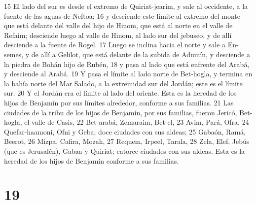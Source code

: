 15 El lado del sur es desde el extremo de Quiriat-jearim, y sale al occidente, a la fuente de las aguas de Neftoa;
16 y desciende este límite al extremo del monte que está delante del valle del hijo de Hinom, que está al norte en el valle de Refaim; desciende luego al valle de Hinom, al lado sur del jebuseo, y de allí desciende a la fuente de Rogel.
17 Luego se inclina hacia el norte y sale a En-semes, y de allí a Gelilot, que está delante de la subida de Adumín, y desciende a la piedra de Bohán hijo de Rubén,
18 y pasa al lado que está enfrente del Arabá, y desciende al Arabá.
19 Y pasa el límite al lado norte de Bet-hogla, y termina en la bahía norte del Mar Salado, a la extremidad sur del Jordán; este es el límite sur.
20 Y el Jordán era el límite al lado del oriente. Esta es la heredad de los hijos de Benjamín por sus límites alrededor, conforme a sus familias.
21 Las ciudades de la tribu de los hijos de Benjamín, por sus familias, fueron Jericó, Bet-hogla, el valle de Casis,
22 Bet-arabá, Zemaraim, Bet-el,
23 Avim, Pará, Ofra,
24 Quefar-haamoni, Ofni y Geba; doce ciudades con sus aldeas;
25 Gabaón, Ramá, Beerot,
26 Mizpa, Cafira, Mozah,
27 Requem, Irpeel, Tarala,
28 Zela, Elef, Jebús (que es Jerusalén), Gabaa y Quiriat; catorce ciudades con sus aldeas. Esta es la heredad de los hijos de Benjamín conforme a sus familias.

\chapter{19}


